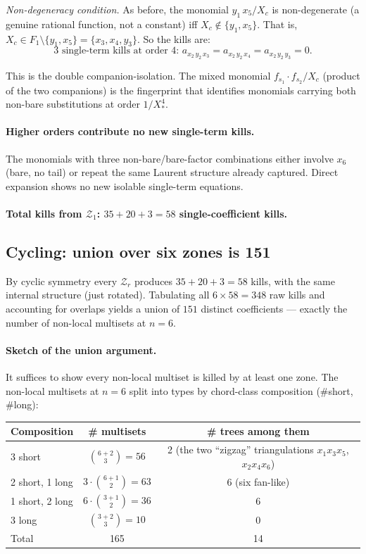 \documentclass[11pt]{article}
\newcommand{\Z}{\mathcal{Z}}
\theoremstyle{definition}
\begin{document}
\emph{Non-degeneracy condition.} As before, the monomial $y_1\,x_5/X_c$ is
non-degenerate (a genuine rational function, not a constant) iff
$X_c \notin \{y_1, x_5\}$. That is, $X_c\in F_1\setminus\{y_1,x_5\}=\{x_3,x_4,y_3\}$.
So the kills are:
\[
\boxed{\text{3 single-term kills at order 4: }
a_{x_2\,y_2\,x_3}=a_{x_2\,y_2\,x_4}=a_{x_2\,y_2\,y_3}=0.}
\]

This is the double companion-isolation. The mixed monomial
$f_{s_1}\cdot f_{s_2}/X_c$ (product of the two companions) is the fingerprint
that identifies monomials carrying both non-bare substitutions at order
$1/X_*^4$.

\paragraph{Higher orders contribute no new single-term kills.}

The monomials with three non-bare/bare-factor combinations either
involve $x_6$ (bare, no tail) or repeat the same Laurent structure already
captured. Direct expansion shows no new isolable single-term equations.

\paragraph{Total kills from $\Z_1$: $35+20+3 = 58$ single-coefficient kills.}

\subsection{Cycling: union over six zones is 151}

By cyclic symmetry every $\Z_r$ produces $35+20+3=58$ kills, with the same
internal structure (just rotated). Tabulating all $6\times 58=348$ raw
kills and accounting for overlaps yields a union of $151$ distinct
coefficients --- exactly the number of non-local multisets at $n=6$.

\paragraph{Sketch of the union argument.} It suffices to show every
non-local multiset is killed by at least one zone. The non-local multisets
at $n=6$ split into types by chord-class composition (\#short, \#long):

\begin{center}
\begin{tabular}{l|c|c}
\toprule
Composition & \# multisets & \# trees among them \\
\midrule
3 short & $\binom{6+2}{3}=56$ & 2 (the two ``zigzag'' triangulations $x_1x_3x_5$, $x_2x_4x_6$) \\
2 short, 1 long & $3\cdot \binom{6+1}{2}=63$ & 6 (six fan-like) \\
1 short, 2 long & $6\cdot \binom{3+1}{2}=36$ & 6 \\
3 long & $\binom{3+2}{3}=10$ & 0 \\
\midrule
Total & 165 & 14 \\
\bottomrule
\end{tabular}
\end{center}
\end{document}
